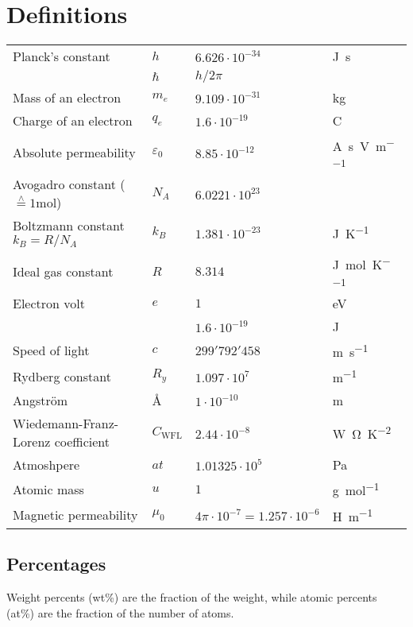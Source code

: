 \section{Definitions}

\begin{table*}[ht]
    \begin{tabularx}{\linewidth}{Xlll}
        \toprule
    	Planck's constant & $h$ & $6.626 \cdot 10^{-34}$ & \si{\J\second} \\
    		& $\hbar$ & $h / 2\pi$ & \\
    	Mass of an electron & $m_e$ &  $9.109 \cdot 10^{-31}$ & \si{\kilogram} \\
    	Charge of an electron & $q_e$ & $1.6 \cdot 10^{-19}$ & \si{\coulomb} \\
    	Absolute permeability & $\varepsilon_0$ & $8.85 \cdot 10^{-12}$ & \si{\ampere\second\per\volt\per\meter} \\
    	Avogadro constant  ($\stackrel{\wedge}{=}1$\si{\mol})& $N_A$ & $6.0221 \cdot 10^{23}$ & \\
    	Boltzmann constant $k_B = R / N_A$& $k_B$ & $1.381 \cdot10^{-23}$ & \si{\J\per\K} \\
    	Ideal gas constant & $R$ & $8.314$ & \si{\J\per\mol\per\K} \\
    	Electron volt & $e$ & $1$ & \si{\eV} \\
    		& & $1.6 \cdot 10^{-19}$ & \si{\J} \\ 
    	Speed of light & $c$ & $299'792'458$ & \si{\meter\per\second} \\
    	Rydberg constant & $R_y$ & $1.097 \cdot 10^{7}$ & \si{\meter\tothe{-1}} \\
    	Angström & \AA & $1 \cdot 10^{-10}$ & \si{\meter} \\
    	Wiedemann-Franz-Lorenz coefficient & $C_{\mathrm{WFL}}$ & $2.44 \cdot 10^{-8}$ & \si{\watt\ohm\per\square\kelvin} \\
    	Atmoshpere & $at$ & $1.01325 \cdot 10^5$ & \si{\pascal} \\
    	Atomic mass & $u$ & $1$ & \si{\g\per\mol}\\
    	Magnetic permeability & $\mu_0$ & $4\pi\cdot 10^{-7} = 1.257 \cdot 10^{-6}$ & \si{\henry\per\meter}\\
    	\bottomrule
    \end{tabularx}
\end{table*}

\subsection{Percentages}
Weight percents (wt\%) are the fraction of the weight, while atomic percents (at\%) are the fraction of the number of atoms.